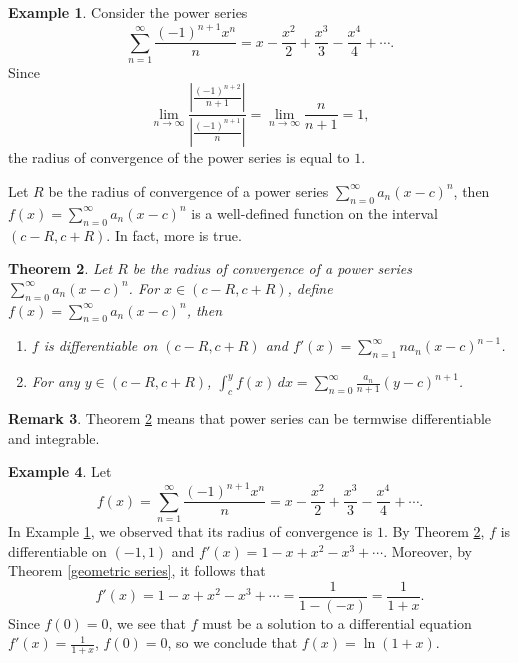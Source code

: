 \documentclass[12pt,letterpaper]{book}
\numberwithin{equation}{section}
\newtheorem{thm}{\textbf{Theorem}}[section]
\theoremstyle{definition}
\newtheorem{example}[thm]{\textbf{Example}}
\newtheorem{remark}[thm]{\textbf{Remark}}
\begin{document}
\begin{example}\label{log}
Consider the power series $$\sum_{n=1}^\infty \frac{(-1)^{n+1}x^n}{n}=x-\frac{x^2}{2}+\frac{x^3}{3}-\frac{x^4}{4}+\cdots.$$
Since $$\lim_{n\to\infty}\frac{\left|\frac{(-1)^{n+2}}{n+1}\right|}{\left|\frac{(-1)^{n+1}}{n}\right|}=\lim_{n\to \infty}\frac{n}{n+1}=1,$$
the radius of convergence of the power series is equal to $1$.
\end{example}

Let $R$ be the radius of convergence of a power series $\displaystyle{\sum_{n=0}^\infty a_n(x-c)^n}$, then $f(x)=\displaystyle{\sum_{n=0}^\infty a_n(x-c)^n}$ is a well-defined function on the interval $(c-R,c+R)$. In fact, more is true.

\begin{thm}\label{term by term}
Let $R$ be the radius of convergence of a power series $\displaystyle{\sum_{n=0}^\infty a_n(x-c)^n}$. For $x\in (c-R, c+R)$, define $f(x)=\displaystyle{\sum_{n=0}^\infty a_n(x-c)^n}$, then
\begin{enumerate}
\item $f$ is differentiable on $(c-R,c+R)$ and $f'(x)=\displaystyle{\sum_{n=1}^\infty na_n(x-c)^{n-1}}$.
\item For any $y\in (c-R,c+R)$, $\displaystyle{\int_{c}^y f(x)\,dx=\sum_{n=0}^\infty \frac{a_n}{n+1}(y-c)^{n+1}}$.
\end{enumerate}
\end{thm}

\begin{remark}
Theorem \ref{term by term} means that power series can be termwise differentiable and integrable.
\end{remark}

\begin{example}
Let $$f(x)=\sum_{n=1}^\infty \frac{(-1)^{n+1}x^n}{n}=x-\frac{x^2}{2}+\frac{x^3}{3}-\frac{x^4}{4}+\cdots.$$
In Example \ref{log}, we observed that its radius of convergence is $1$. By Theorem \ref{term by term}, $f$ is differentiable on $(-1,1)$ and $f'(x)=1-x+x^2-x^3+\cdots$. Moreover, by Theorem \ref{geometric series}, it follows that
$$f'(x)=1-x+x^2-x^3+\cdots=\frac{1}{1-(-x)}=\frac{1}{1+x}.$$
Since $f(0)=0$, we see that $f$ must be a solution to a differential equation $f'(x)=\frac{1}{1+x}$, $f(0)=0$, so we conclude that $f(x)=\ln (1+x)$.
\end{example}
\end{document}
